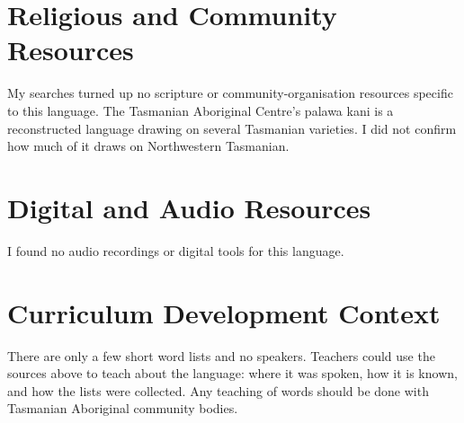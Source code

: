\documentclass[12pt]{article}
\begin{document}
\section{Religious and Community Resources}
My searches turned up no scripture or community-organisation resources specific to this language. The Tasmanian Aboriginal Centre's palawa kani is a reconstructed language drawing on several Tasmanian varieties. I did not confirm how much of it draws on Northwestern Tasmanian.

\section{Digital and Audio Resources}
I found no audio recordings or digital tools for this language.

\section{Curriculum Development Context}
There are only a few short word lists and no speakers. Teachers could use the sources above to teach about the language: where it was spoken, how it is known, and how the lists were collected. Any teaching of words should be done with Tasmanian Aboriginal community bodies.
\end{document}
